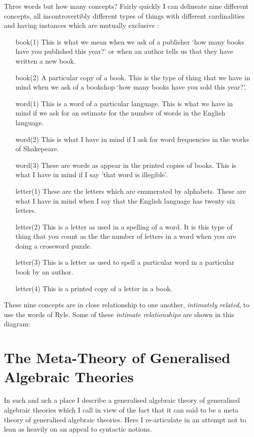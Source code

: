 \documentclass[10pt,a4paper]{article}
\begin{document}
\mynote 
Three words but how many concepts? Fairly quickly I can delineate nine different concepts, all incontrovertibly 
different types of things with different cardinalities and having instances which are mutually exclusive :
\begin{itemize}
\item [book(1)] This is what we mean when we ask of a publisher `how many books have you published this year?' 
or when an author tells us that they have written a new book.
\item [book(2)] A particular copy of a book. This is the type of thing that we have in mind
 when we ask of a bookshop `how many books have you sold this year?'.
\item [word(1)] This is a word of a particular language. This is what we have in mind if we ask for an estimate for the number of words 
in the English language. 
\item [word(2)] This is what I have in mind if I ask for word frequencies in the works of Shakepeare.   
\item [word(3)] These are words as appear in the printed copies of books. This is what I have in mind if I say 'that word is illegible'.
\item [letter(1)] These are the letters which are enumerated by alphabets. These are what I have in mind when I say that the English language has
twenty six letters.
\item [letter(2)] This is a letter as used in a spelling of a word. It is this type of thing that you count 
as the the number of letters in a word when you are doing a crossword puzzle. 
\item [letter(3)] This is a letter as used to spell a particular word in a particular book by an author. 
\item [letter(4)] This is a printed copy of a letter in a book. 
\end{itemize}

\mynote
These nine  concepts are in close relationship to one another, \textit{intimately related}, to use the words of Ryle.
Some of these \textit{intimate relationships} are shown in this diagram:
  



\section{The Meta-Theory of Generalised Algebraic Theories}
In such and uch a place I describe a generalised algebraic theory of generalised algebraic theories  
which I call  in view of the fact that it can said to be a meta theory of generalised algebraic theories.
Here I re-articulate in an attempt not to lean as heavily on an appeal to syntactic notions. 
\end{document}
